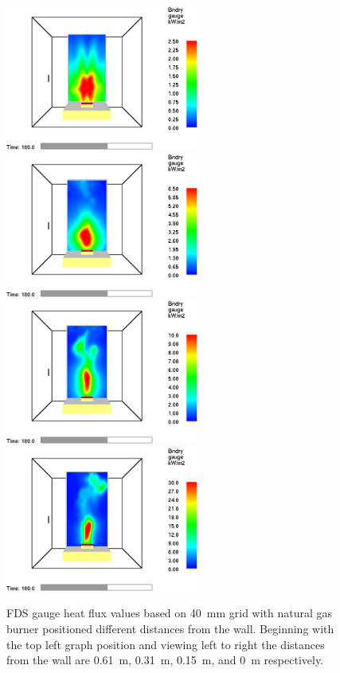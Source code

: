\documentclass[twoside]{uocthesis}
\begin{document}
\begin{figure}[h]
  \centering
  \includegraphics[width=2.5in]{../Figures/NG_80kW_GBWall_2D_RI=10_0300HF}
  \includegraphics[width=2.5in]{../Figures/NG_80kW_GBWall_1D_RI=10_0300HF}\\
  \includegraphics[width=2.5in]{../Figures/NG_80kW_GBWall_p5D_RI=10_0300HF}
  \includegraphics[width=2.5in]{../Figures/NG_80kW_GBWall_0D_RI=10_0300HF}\\
  \caption[FDS gauge heat flux values based on 40~mm grid with natural gas burner positioned different distances from the wall]{FDS gauge heat flux values based on 40~mm grid with natural gas burner positioned different distances from the wall. Beginning with the top left graph position and viewing left to right the distances from the wall are 0.61~m, 0.31~m, 0.15~m, and 0~m respectively.}
  \label{FDS_WallHF_IWGB_comp}
\end{figure}
\end{document}
